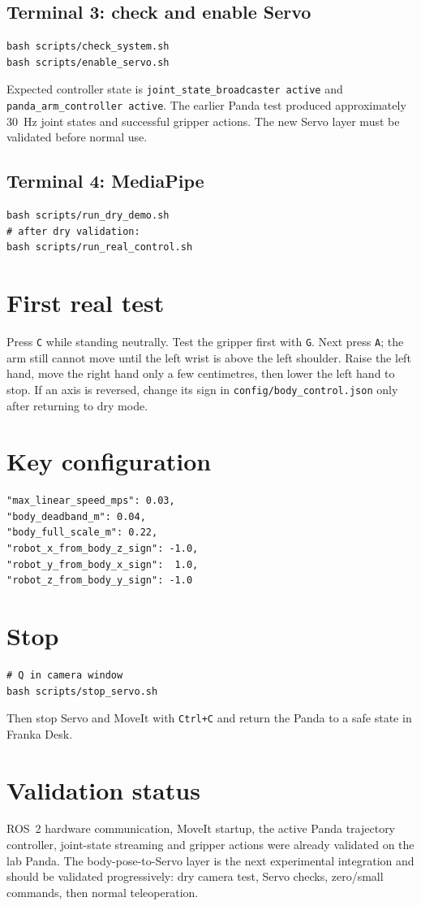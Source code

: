\documentclass[11pt,a4paper]{article}
\begin{document}
\subsection*{Terminal 3: check and enable Servo}\begin{lstlisting}
bash scripts/check_system.sh
bash scripts/enable_servo.sh
\end{lstlisting}
Expected controller state is \texttt{joint\_state\_broadcaster active} and \texttt{panda\_arm\_controller active}. The earlier Panda test produced approximately 30~Hz joint states and successful gripper actions. The new Servo layer must be validated before normal use.
\subsection*{Terminal 4: MediaPipe}\begin{lstlisting}
bash scripts/run_dry_demo.sh
# after dry validation:
bash scripts/run_real_control.sh
\end{lstlisting}
\section{First real test}Press \texttt{C} while standing neutrally. Test the gripper first with \texttt{G}. Next press \texttt{A}; the arm still cannot move until the left wrist is above the left shoulder. Raise the left hand, move the right hand only a few centimetres, then lower the left hand to stop. If an axis is reversed, change its sign in \texttt{config/body\_control.json} only after returning to dry mode.
\section{Key configuration}\begin{lstlisting}
"max_linear_speed_mps": 0.03,
"body_deadband_m": 0.04,
"body_full_scale_m": 0.22,
"robot_x_from_body_z_sign": -1.0,
"robot_y_from_body_x_sign":  1.0,
"robot_z_from_body_y_sign": -1.0
\end{lstlisting}
\section{Stop}\begin{lstlisting}
# Q in camera window
bash scripts/stop_servo.sh
\end{lstlisting}
Then stop Servo and MoveIt with \texttt{Ctrl+C} and return the Panda to a safe state in Franka Desk.
\section{Validation status}ROS~2 hardware communication, MoveIt startup, the active Panda trajectory controller, joint-state streaming and gripper actions were already validated on the lab Panda. The body-pose-to-Servo layer is the next experimental integration and should be validated progressively: dry camera test, Servo checks, zero/small commands, then normal teleoperation.
\end{document}
